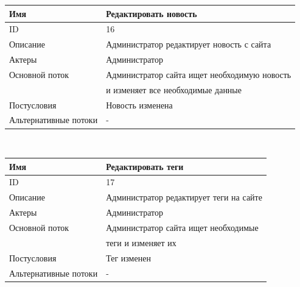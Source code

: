 \newpage
\BgThispage
\begin{center}
    \begin{tabular}{|l|l|}
        \hline
        Имя                   & Редактировать новость                        \\
        \hline
        ID                    & 16                                           \\
        \hline
        Описание              & Администратор редактирует новость с сайта    \\
        \hline
        Актеры                & Администратор                                \\
        \hline
        Основной поток        & Администратор сайта ищет необходимую новость \\
        & и изменяет все необходимые данные            \\
        \hline
        Постусловия           & Новость изменена                             \\
        \hline
        Альтернативные потоки & -                                            \\
        \hline
    \end{tabular}\\
    \vspace{0.5cm}
    \begin{tabular}{|l|l|}
        \hline
        Имя                   & Редактировать теги                      \\
        \hline
        ID                    & 17                                      \\
        \hline
        Описание              & Администратор редактирует теги на сайте \\
        \hline
        Актеры                & Администратор                           \\
        \hline
        Основной поток        & Администратор сайта ищет необходимые    \\
        & теги и изменяет их                      \\
        \hline
        Постусловия           & Тег изменен                             \\
        \hline
        Альтернативные потоки & -                                       \\
        \hline
    \end{tabular}\\
    \vspace{0.5cm}

\end{center}
